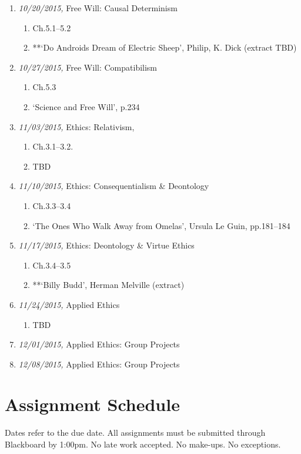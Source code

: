 \documentclass[11pt,article,oneside]{memoir}
\begin{document}
\begin{itemize}
{\begin{enumerate}
\item \textit{10/20/2015,} Free Will: Causal Determinism
\begin{enumerate}
\item Ch.5.1--5.2
\item **`Do Androids Dream of Electric Sheep', Philip, K. Dick (extract TBD)

\end{enumerate}

\item \textit{10/27/2015,} Free Will: Compatibilism
\begin{enumerate}
\item Ch.5.3
\item `Science and Free Will', p.234
\end{enumerate}


\item \textit{11/03/2015,} Ethics: Relativism, 
\begin{enumerate}
\item Ch.3.1--3.2.
\item TBD
\end{enumerate}
\item \textit{11/10/2015,} Ethics: Consequentialism \& Deontology
\begin{enumerate}
\item Ch.3.3--3.4
\item  `The Ones Who Walk Away from Omelas', Ursula Le Guin, pp.181--184 
\end{enumerate}
\item \textit{11/17/2015,} Ethics: Deontology \& Virtue Ethics
\begin{enumerate}
\item Ch.3.4--3.5
\item **`Billy Budd', Herman Melville (extract)
\end{enumerate}
\item \textit{11/24/2015,} Applied Ethics
\begin{enumerate}
\item TBD
\end{enumerate}
\item \textit{12/01/2015,} Applied Ethics: Group Projects
\item \textit{12/08/2015,} Applied Ethics: Group Projects
\end{enumerate}






\section{Assignment Schedule}
Dates refer to the due date. All assignments must be submitted through Blackboard by 1:00pm. No late work accepted. No make-ups. No exceptions. 

}
\end{itemize}
\end{document}
